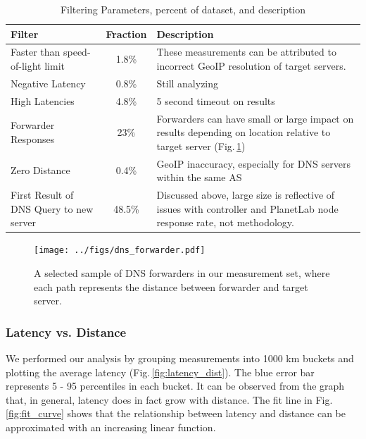 \begin{table}[!htb]
    \small
  \begin{tabular}{ p{5cm} | c | p{10cm}}
    \hline
    Filter & Fraction & Description \\
    \hline
    Faster than speed-of-light limit & 1.8\% & These measurements can be attributed to incorrect GeoIP resolution of target servers. \\
    \hline
    Negative Latency & 0.8\% & Still analyzing \\
    \hline
    High Latencies & 4.8\% & 5 second timeout on results \\
    \hline
    Forwarder Responses & 23\% & Forwarders can have small or large impact on results depending on location relative to target server (Fig.\,\ref{fig:forwarder_viz}) \\
    \hline
    Zero Distance & 0.4\% & GeoIP inaccuracy, especially for DNS servers within the same AS \\
    \hline
    First Result of DNS Query to new server & 48.5\% & Discussed above, large size is reflective of issues with controller and PlanetLab node response rate, not methodology. \\
    \hline
  \end{tabular}
  \vspace{1em}
  \caption{Filtering Parameters, percent of dataset, and description}
  \label{tab:filter}
\end{table}

\begin{figure}
  \centering
  \texttt{[image: ../figs/dns\_forwarder.pdf]}
  \vspace{-1em}
  \caption{A selected sample of DNS forwarders in our measurement set, where each path represents the distance between forwarder and target server.}
  \label{fig:forwarder_viz}
\end{figure}

\subsubsection{Latency vs. Distance}
We performed our analysis by grouping measurements into 1000 km buckets and plotting the average latency (Fig.\,\ref{fig:latency_dist}). The blue error bar represents 5 - 95 percentiles in each bucket. It can be observed from the graph that, in general, latency does in fact grow with distance. The fit line in Fig.\,\ref{fig:fit_curve} shows that the relationship between latency and distance can be approximated with an increasing linear function.

